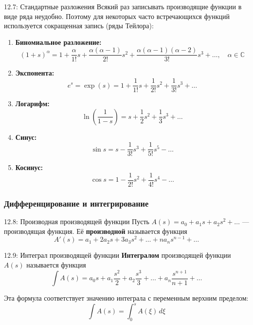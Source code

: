 \documentclass[a4paper,12pt]{article}
\begin{document}
	\begin{remarkbox}{12.7: Стандартные разложения}
		Всякий раз записывать производящие функции в виде ряда неудобно. Поэтому для некоторых часто встречающихся функций используется сокращенная запись (ряды Тейлора):
		
		\begin{enumerate}
			\item \textbf{Биномиальное разложение:}
			\[ (1 + s)^\alpha = 1 + \frac{\alpha}{1!}s + \frac{\alpha(\alpha-1)}{2!}s^2 + \frac{\alpha(\alpha-1)(\alpha-2)}{3!}s^3 + \dots, \quad \alpha \in \mathbb{C} \]
			
			\item \textbf{Экспонента:}
			\[ e^s = \exp(s) = 1 + \frac{1}{1!}s + \frac{1}{2!}s^2 + \frac{1}{3!}s^3 + \dots \]
			
			\item \textbf{Логарифм:}
			\[ \ln\left(\frac{1}{1-s}\right) = s + \frac{1}{2}s^2 + \frac{1}{3}s^3 + \dots \]
			
			\item \textbf{Синус:}
			\[ \sin s = s - \frac{1}{3!}s^3 + \frac{1}{5!}s^5 - \dots \]
			
			\item \textbf{Косинус:}
			\[ \cos s = 1 - \frac{1}{2!}s^2 + \frac{1}{4!}s^4 - \dots \]
		\end{enumerate}
	\end{remarkbox}
	
	\subsubsection{Дифференцирование и интегрирование}
	
	\begin{definitionbox}{12.8: Производная производящей функции}
		Пусть \(A(s) = a_0 + a_1 s + a_2 s^2 + \dots\) — производящая функция. Её \textbf{производной} называется функция
		\[ A'(s) = a_1 + 2a_2 s + 3a_3 s^2 + \dots + n a_n s^{n-1} + \dots \]
	\end{definitionbox}
	
	\begin{definitionbox}{12.9: Интеграл производящей функции}
		\textbf{Интегралом} производящей функции \(A(s)\) называется функция
		\[ \int A(s)   = a_0 s + a_1 \frac{s^2}{2} + a_2 \frac{s^3}{3} + \dots + a_n \frac{s^{n+1}}{n+1} + \dots \]
		
		Эта формула соответствует значению интеграла с переменным верхним пределом:
		\[ \int A(s) = \int_0^s A(\xi) \, d\xi \]
	\end{definitionbox}
	
\end{document}
